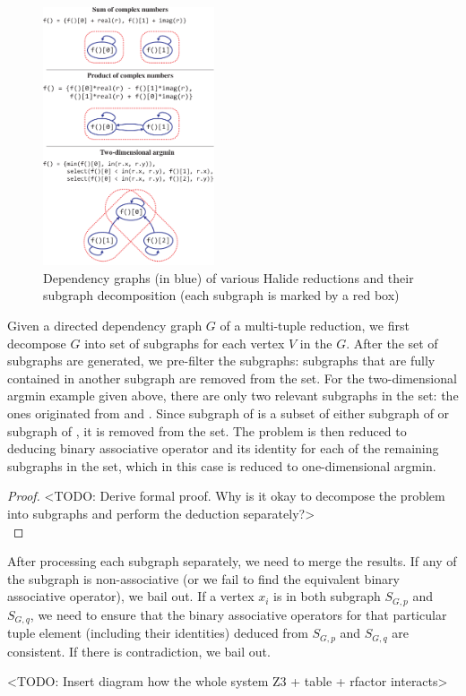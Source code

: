 \begin{figure}
\centering
\label{fig:subgraphs}
\includegraphics[width=0.45\textwidth]{subgraphs}
\caption{Dependency graphs (in blue) of various Halide reductions and their subgraph decomposition (each subgraph is marked by a red box)}
\end{figure}

Given a directed dependency graph $G$ of a multi-tuple reduction, we first decompose $G$ into set of subgraphs for each vertex $V$ in the $G$. After the set of subgraphs are generated, we pre-filter the subgraphs: subgraphs that are fully contained in another subgraph are removed from the set. For the two-dimensional argmin example given above, there are only two relevant subgraphs in the set: the ones originated from  and . Since subgraph of  is a subset of either subgraph of  or subgraph of , it is removed from the set. The problem is then reduced to deducing binary associative operator and its identity for each of the remaining subgraphs in the set, which in this case is reduced to one-dimensional argmin. 

\begin{proof}
<TODO: Derive formal proof. Why is it okay to decompose the problem into subgraphs and perform the deduction separately?> \\
\end{proof}

After processing each subgraph separately, we need to merge the results. If any of the subgraph is non-associative (or we fail to find the equivalent binary associative operator), we bail out. If a vertex $x_i$ is in both subgraph $S_{G, p}$ and $S_{G, q}$, we need to ensure that the binary associative operators for that particular tuple element (including their identities) deduced from $S_{G, p}$ and $S_{G, q}$ are consistent. If there is contradiction, we bail out.  

<TODO: Insert diagram how the whole system Z3 + table + rfactor interacts>